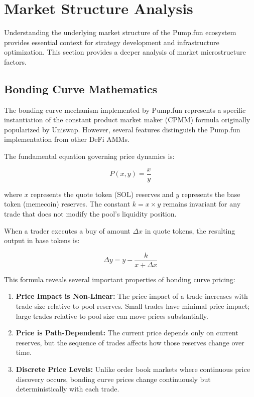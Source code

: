 \documentclass[12pt,a4paper]{article}
\begin{document}
\section{Market Structure Analysis}

Understanding the underlying market structure of the Pump.fun ecosystem provides essential context for strategy development and infrastructure optimization. This section provides a deeper analysis of market microstructure factors.

\subsection{Bonding Curve Mathematics}

The bonding curve mechanism implemented by Pump.fun represents a specific instantiation of the constant product market maker (CPMM) formula originally popularized by Uniswap. However, several features distinguish the Pump.fun implementation from other DeFi AMMs.

The fundamental equation governing price dynamics is:

\begin{equation}
P(x, y) = \frac{x}{y}
\end{equation}

where $x$ represents the quote token (SOL) reserves and $y$ represents the base token (memecoin) reserves. The constant $k = x \times y$ remains invariant for any trade that does not modify the pool's liquidity position.

When a trader executes a buy of amount $\Delta x$ in quote tokens, the resulting output in base tokens is:

\begin{equation}
\Delta y = y - \frac{k}{x + \Delta x}
\end{equation}

This formula reveals several important properties of bonding curve pricing:

\begin{enumerate}
\item \textbf{Price Impact is Non-Linear:} The price impact of a trade increases with trade size relative to pool reserves. Small trades have minimal price impact; large trades relative to pool size can move prices substantially.

\item \textbf{Price is Path-Dependent:} The current price depends only on current reserves, but the sequence of trades affects how those reserves change over time.

\item \textbf{Discrete Price Levels:} Unlike order book markets where continuous price discovery occurs, bonding curve prices change continuously but deterministically with each trade.
\end{enumerate}
\end{document}
